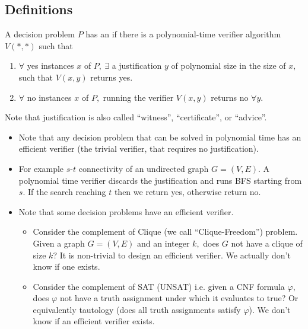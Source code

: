 \documentclass[a4paper,12pt]{article}
\begin{document}
\subsection{Definitions}
\begin{definition}
     A decision problem $P$ has an  if there is a polynomial-time verifier algorithm $V(*,*)$ such that \begin{enumerate}
        \item $\forall$ yes instances $x$ of $P,~\exists$ a justification $y$ of polynomial size in the size of $x,$ such that $V(x,y)$ returns yes.
        \item $\forall$ no instances $x$ of $P,$ running the verifier $V(x,y)$ returns no $\forall y.$ 
     \end{enumerate}
     Note that justification is also called ``witness'', ``certificate'', or ``advice''.
\end{definition}
\begin{itemize}
    \item Note that any decision problem that can be solved in polynomial time has an efficient verifier (the trivial verifier, that requires no justification).
    \item For example $s$-$t$ connectivity of an undirected graph $G=(V,E).$ A polynomial time verifier discards the justification and runs BFS starting from $s.$ If the search reaching $t$ then we return yes, otherwise return no.
    \item Note that some decision problems  have an efficient verifier.
    \begin{itemize}
        \item Consider the complement of Clique (we call ``Clique-Freedom'') problem. Given a graph $G=(V,E)$ and an integer $k,$ does $G$ not have a clique of size $k$? It is non-trivial to design an efficient verifier. We actually don't know if one exists.
        \item Consider the complement of SAT (UNSAT) i.e. given a CNF formula $\varphi,$ does $\varphi$ not have a truth assignment under which it evaluates to true? Or equivalently tautology (does all truth assignments satisfy $\varphi$). We don't know if an efficient verifier exists.
    \end{itemize}
\end{itemize}
\end{document}
